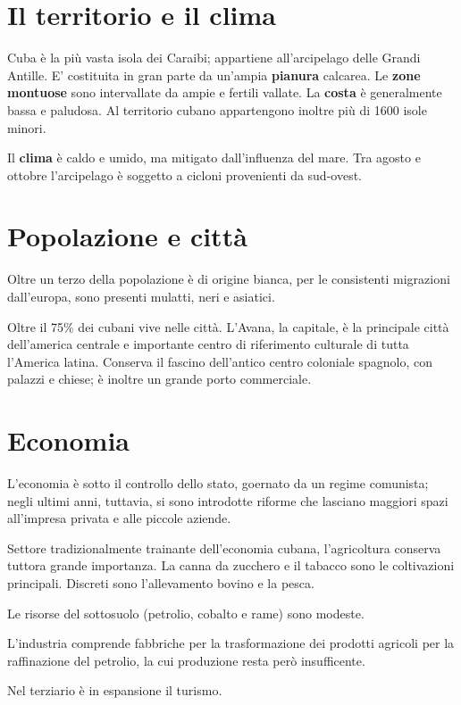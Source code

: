 \section{Il territorio e il clima}
Cuba è la più vasta isola dei Caraibi; appartiene all'arcipelago delle Grandi Antille. E' costituita in gran parte da un'ampia {\bf pianura} calcarea. Le {\bf zone montuose} sono intervallate da ampie e fertili vallate. La {\bf costa} è generalmente bassa e paludosa. Al territorio cubano appartengono inoltre più di 1600 isole minori.

Il {\bf clima} è caldo e umido, ma mitigato dall'influenza del mare. Tra agosto e ottobre l'arcipelago è soggetto a cicloni provenienti da sud-ovest.

\section{Popolazione e città}
Oltre un terzo della popolazione è di origine bianca, per le consistenti migrazioni dall'europa, sono presenti mulatti, neri e asiatici.

Oltre il 75\% dei cubani vive nelle città. L'Avana, la capitale, è la principale città dell'america centrale e importante centro di riferimento culturale di tutta l'America latina. Conserva il fascino dell'antico centro coloniale spagnolo, con palazzi e chiese; è inoltre un grande porto commerciale.

\section{Economia}
L'economia è sotto il controllo dello stato, goernato da un regime comunista; negli ultimi anni, tuttavia, si sono introdotte riforme che lasciano maggiori spazi all'impresa privata e alle piccole aziende.

Settore tradizionalmente trainante dell'economia cubana, l'agricoltura conserva tuttora grande importanza. La canna da zucchero e il tabacco sono le coltivazioni principali. Discreti sono l'allevamento bovino e la pesca.

Le risorse del sottosuolo (petrolio, cobalto e rame) sono modeste.

L'industria comprende fabbriche per la trasformazione dei prodotti agricoli per la raffinazione del petrolio, la cui produzione resta però insufficente.

Nel terziario è in espansione il turismo.
